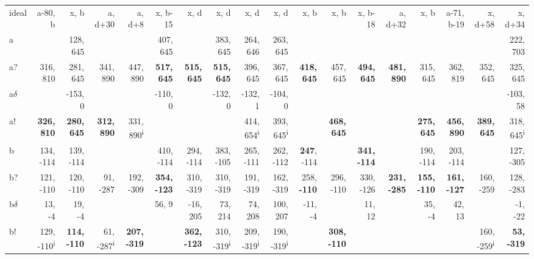 \begin{table}[p]
{\begin{tabular}{lrrrrrrrrrrrrrrrrr}
ideal & a-80, b & x, b & a, d+30 & a, d+8 & x, b-15 & x, d & x, d & x, d & x, d & x, b & x, b & x, b-18 & a, d+32 & x, b & a-71, b-19 & x, d+58 & x, d+34 \\
a &  & 128, 645 &  &  & 407, 645 &  & 383, 645 & 264, 646 & 263, 645 &  &  &  &  &  &  &  & 222, 703 \\
a? & 316, 810 & 281, 645 & 341, 890 & 447, 890 & \textbf{517, 645} & \textbf{515, 645} & \textbf{515, 645} & 396, 645 & 367, 645 & \textbf{418, 645} & 457, 645 & \textbf{494, 645} & \textbf{481, 890} & 315, 645 & 362, 819 & 352, 645 & 325, 645 \\
a$\delta$ &  & -153, 0 &  &  & -110, 0 &  & -132, 0 & -132, 1 & -104, 0 &  &  &  &  &  &  &  & -103, 58 \\
a! & \textbf{326, 810} & \textbf{280, 645} & \textbf{312, 890} & 331, 890\textsuperscript{i} &  &  &  & 414, 654\textsuperscript{i} & 393, 645\textsuperscript{i} &  & \textbf{468, 645} &  &  & \textbf{275, 645} & \textbf{456, 890} & \textbf{389, 645} & 318, 645\textsuperscript{i} \\
b & 134, -114 & 139, -114 &  &  & 410, -114 & 294, -114 & 383, -105 & 265, -111 & 262, -112 & \textbf{247}, -114 &  & \textbf{341, -114} &  & 190, -114 & 203, -114 &  & 127, -305 \\
b? & 121, -110 & 120, -110 & 91, -287 & 192, -309 & \textbf{354, -123} & 310, -319 & 310, -319 & 191, -319 & 162, -319 & 258, \textbf{-110} & 296, -110 & 330, -126 & \textbf{231, -285} & \textbf{155, -110} & \textbf{161, -127} & 160, -259 & 128, -283 \\
b$\delta$ & 13, -4 & 19, -4 &  &  & 56, 9 & -16, 205 & 73, 214 & 74, 208 & 100, 207 & -11, -4 &  & 11, 12 &  & 35, -4 & 42, 13 &  & -1, -22 \\
b! & 129, -110\textsuperscript{i} & \textbf{114, -110} & 61, -287\textsuperscript{i} & \textbf{207, -319} &  & \textbf{362, -123} & 310, -319\textsuperscript{i} & 209, -319\textsuperscript{i} & 190, -319\textsuperscript{i} &  & \textbf{308, -110} &  &  &  &  & 160, -259\textsuperscript{i} & \textbf{53, -319} \\

\end{tabular}}
\end{table}
